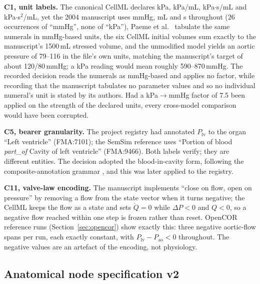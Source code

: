 \documentclass[11pt,letterpaper]{article}
\begin{document}
\textbf{C1, unit labels.} The canonical CellML declares kPa, kPa/mL, kPa$\cdot$s/mL and kPa$\cdot$s$^2$/mL, yet the 2004 manuscript uses mmHg, mL and s throughout (26 occurrences of ``mmHg'', none of ``kPa''), Paeme et al.\ \citep{paeme2011mitral} tabulate the same numerals in mmHg-based units, the six CellML initial volumes sum exactly to the manuscript's 1500\,mL stressed volume, and the unmodified model yields an aortic pressure of 79--116 in the file's own units, matching the manuscript's target of about 120/80\,mmHg; a kPa reading would mean roughly 590--870\,mmHg. The recorded decision reads the numerals as mmHg-based and applies no factor, while recording that the manuscript tabulates no parameter values and so no individual numeral's unit is stated by its authors. Had a kPa$\to$mmHg factor of 7.5 been applied on the strength of the declared units, every cross-model comparison would have been corrupted.

\textbf{C5, bearer granularity.} The project registry had annotated $P_{\mathrm{lv}}$ to the organ ``Left ventricle'' (FMA:7101); the SemSim reference uses ``Portion of blood \emph{part\_of} Cavity of left ventricle'' (FMA:9466). Both labels verify; they are different entities. The decision adopted the blood-in-cavity form, following the composite-annotation grammar \citep{gennari2011composite}, and this was later applied to the registry.

\textbf{C11, valve-law encoding.} The manuscript implements ``close on flow, open on pressure'' by removing a flow from the state vector when it turns negative; the CellML keeps the flow as a state and sets $\dot Q=0$ while $\Delta P<0$ and $Q<0$, so a negative flow reached within one step is frozen rather than reset. OpenCOR reference runs (Section~\ref{sec:opencor}) show exactly this: three negative aortic-flow spans per run, each exactly constant, with $P_{\mathrm{lv}}-P_{\mathrm{ao}}<0$ throughout. The negative values are an artefact of the encoding, not physiology.

\subsection{Anatomical node specification v2}
\label{sec:nodes}
\end{document}
